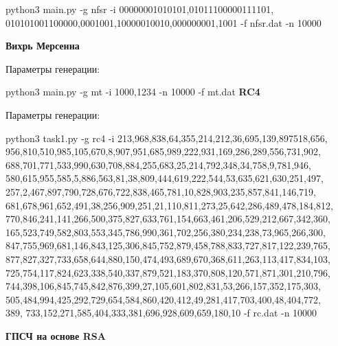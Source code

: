 \documentclass[spec, och, labwork]{shiza}
\begin{document}
  python3 main.py -g nfsr -i 00000001010101,01011100000111101,\\
  010101001100000,0001001,10000010010,000000001,1001 -f nfsr.dat 
  -n 10000
  \vspace{5mm}

 \textbf{Вихрь Мерсенна}

 Параметры генерации:
 
  python3 main.py -g mt -i 1000,1234 -n 10000 -f mt.dat
  \vspace{5mm}
 \textbf{RC4}

  Параметры генерации:
 
  python3 task1.py -g rc4 -i 213,968,838,64,355,214,212,36,695,139,897518,656,\\
  956,810,510,985,105,670,8,907,951,685,989,222,931,169,286,289,556,731,902,\\
  688,701,771,533,990,630,708,884,255,683,25,214,792,348,34,758,9,781,946,\\
  580,615,955,585,5,886,563,81,38,809,444,619,222,544,53,635,621,630,251,497,\\
  257,2,467,897,790,728,676,722,838,465,781,10,828,903,235,857,841,146,719,\\
  681,678,961,652,491,38,256,909,251,21,110,811,273,25,642,286,489,478,184,812,\\
  770,846,241,141,266,500,375,827,633,761,154,663,461,206,529,212,667,342,360,\\
  165,523,749,582,803,553,345,786,990,361,702,256,380,234,238,73,965,266,300,\\
  847,755,969,681,146,843,125,306,845,752,879,458,788,833,727,817,122,239,765,\\
  877,827,327,733,658,644,880,150,474,493,689,670,368,611,263,113,417,834,103,\\
  725,754,117,824,623,338,540,337,879,521,183,370,808,120,571,871,301,210,796,\\
  744,398,106,845,745,842,876,399,27,105,601,802,831,53,266,157,352,175,303,\\
  505,484,994,425,292,729,654,584,860,420,412,49,281,417,703,400,48,404,772,\\389,
  733,152,271,585,404,333,381,696,928,609,659,180,10 -f rc.dat -n 10000
  \vspace{5mm}

 \textbf{ГПСЧ на основе RSA}
\end{document}
